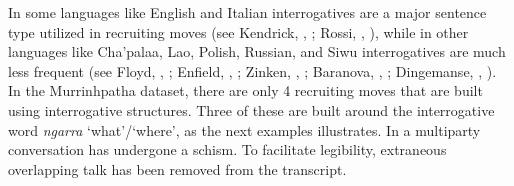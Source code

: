 \documentclass[output=paper,nonflat,colorlinks,citecolor=brown]{langsci/langscibook}
\begin{document}
In some languages like English and Italian interrogatives are a major sentence type utilized in recruiting moves (see Kendrick, , ; Rossi, , ), while in other languages like Cha’palaa, Lao, Polish, Russian, and Siwu interrogatives are much less frequent (see Floyd, , ; Enfield, , ; Zinken, , ; Baranova, , ; Dingemanse, , ). In the Murrinhpatha dataset, there are only 4 recruiting moves that are built using interrogative structures. Three of these are built around the interrogative word \textit{ngarra} ‘what’/‘where’, as the next examples illustrates. In  a multiparty conversation has undergone a schism. To facilitate legibility, extraneous overlapping talk has been removed from the transcript.
\end{document}
